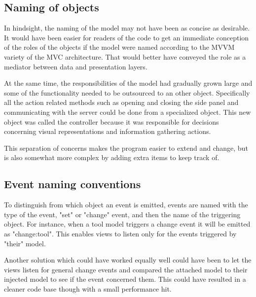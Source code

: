 \documentclass[english]{ifimaster}
\begin{document}
\subsection{Naming of objects}
In hindsight, the naming of the model may not have been as concise as desirable. It would have been easier for readers of the code to get an immediate conception of the roles of the objects if the model were named according to the MVVM variety of the MVC architecture. That would better have conveyed the role as a mediator between data and presentation layers.

At the same time, the responsibilities of the model had gradually grown large and some of the functionality needed to be outsourced to an other object. Specifically all the action related methods such as opening and closing the side panel and communicating with the server could be done from a specialized object. This new object was called the controller because it was responsible for decisions concerning visual representations and information gathering actions. 

This separation of concerns makes the program easier to extend and change, but is also somewhat more complex by adding extra items to keep track of.

 


\subsection{Event naming conventions}
\label{sec:eventNaming}
To distinguish from which object an event is emitted, events are named with the type of the event, "set" or "change" event, and then the name of the triggering object. For instance, when a tool model triggers a change event it will be emitted as "change:tool". This enables views to listen only for the events triggered by "their" model. 

Another solution which could have worked equally well could have been to let the views listen for general change events and compared the attached model to their injected model to see if the event concerned them. This could have resulted in a cleaner code base though with a small performance hit. 
\end{document}

